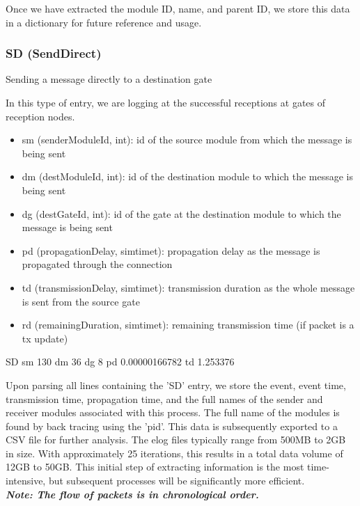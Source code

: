     Once we have extracted the module ID, name, and parent ID, we store this data in a dictionary for future reference and usage.
    
   \subsubsection{SD (SendDirect)} 
   Sending a message directly to a destination gate

    In this type of entry, we are logging at the successful receptions at gates of reception nodes.
   
    \begin{itemize}
    \item  sm (senderModuleId, int): id of the source module from which the message is being sent
    \item dm (destModuleId, int): id of the destination module to which the message is being sent
    \item dg (destGateId, int): id of the gate at the destination module to which the message is being sent
    \item pd (propagationDelay, simtime\textunderscore t): propagation delay as the message is propagated through the connection
    \item td (transmissionDelay, simtime\textunderscore t): transmission duration as the whole message is sent from the source gate
    \item rd (remainingDuration, simtime\textunderscore t): remaining transmission time (if packet is a tx update)
\end{itemize}

\begin{rubycode}
    SD sm 130 dm 36 dg 8 pd 0.00000166782 td 1.253376
\end{rubycode}
Upon parsing all lines containing the 'SD' entry, we store the event, event time, transmission time, propagation time, and the full names of the sender and receiver modules associated with this process. The full name of the modules is found by back tracing using the 'pid'. This data is subsequently exported to a CSV file for further analysis. The elog files typically range from 500MB to 2GB in size. With approximately 25 iterations, this results in a total data volume of 12GB to 50GB. This initial step of extracting information is the most time-intensive, but subsequent processes will be significantly more efficient.\\

\textbf{\textit{Note: The flow of packets is in chronological order.}}\\


